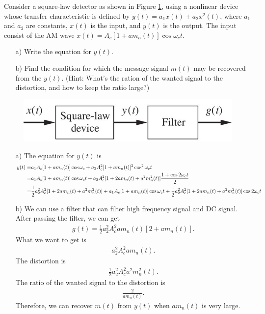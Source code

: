 \documentclass{assignment}
\begin{document}
\begin{prob}
    Consider a square-law detector as shown in Figure \ref{Assignment-4-Problem-5}, using a nonlinear device whose transfer characteristic is defined by $y(t)=a_1x(t)+a_2x^2(t)$, where $a_1$ and $a_2$ are constants, $x(t)$ is the input, and $y(t)$ is the output. The input consist of the AM wave $x(t)=A_c[1+am_n(t)]\cos\omega_ct$.
    \begin{itemize}
        \item[a)] Write the equation for $y(t)$.
        \item[b)] Find the condition for which the message signal $m(t)$ may be recovered from the $y(t)$. (Hint: What's the ration of the wanted signal to the distortion, and how to keep the ratio large?)
    \end{itemize}
    \begin{figure}[h]
        \centering
        \includegraphics[width=.5\columnwidth]{Assignment-4-Problem-5.jpg}
        \caption{}
        \label{Assignment-4-Problem-5}
    \end{figure}
\end{prob}
\begin{sol}
    \begin{itemize}
        \item[a)] The equation for $y(t)$ is
        \begin{align}
            \notag y(t)=&a_1A_c[1+am_n(t)]\cos\omega_c+a_2A_c^2[1+am_n(t)]^2\cos^2\omega_ct\\
            \notag=&a_1A_c[1+am_n(t)]\cos\omega_ct+a_2A_c^2[1+2am_n(t)+a^2m_n^2(t)]\frac{1+\cos 2\omega_ct}{2}\\
            =&\frac{1}{2}a_2^2A_c^2[1+2am_n(t)+a^2m_n^2(t)]+a_1A_c[1+am_n(t)]\cos\omega_ct+\frac{1}{2}a_2^2A_c^2[1+2am_n(t)+a^2m_n^2(t)]\cos 2\omega_ct
        \end{align}
        \item[b)] We can use a filter that can filter high frequency signal and DC signal. After passing the filter, we can get
        \begin{align}
            g(t)=\frac{1}{2}a_2^2A_c^2am_n(t)[2+am_n(t)].
        \end{align}
        What we want to get is
        \begin{align}
            a_2^2A_c^2am_n(t).
        \end{align}
        The distortion is
        \begin{align}
            \frac{1}{2}a_2^2A_c^2a^2m_n^2(t).
        \end{align}
        The ratio of the wanted signal to the distortion is
        \begin{align}
            \frac{2}{am_n(t)}.
        \end{align}
        Therefore, we can recover $m(t)$ from $y(t)$ when $am_n(t)$ is very large.
    \end{itemize}
\end{sol}
\end{document}
